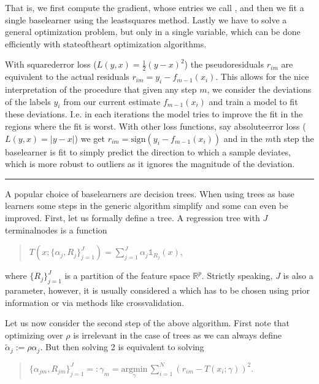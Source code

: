 \documentclass[letterpaper,10pt,english]{sphinxmanual}
\begin{document}
That is, we first compute the gradient, whose entries we call , and then we fit a single base\sphinxhyphen{}learner using the least\sphinxhyphen{}squares method. Lastly we have to solve a general optimization problem, but only in a single variable, which can be done efficiently with state\sphinxhyphen{}of\sphinxhyphen{}the\sphinxhyphen{}art optimization algorithms.

With squared\sphinxhyphen{}error loss (\(L(y, x) = \frac{1}{2}(y - x)^2\)) the pseudo\sphinxhyphen{}residuals \(r_{im}\) are equivalent to the actual residuals \(r_{im} = y_i - f_{m-1}(x_i)\). This allows for the nice interpretation of the procedure that given any step \(m\), we consider the deviations of the labels \(y_i\) from our current estimate \(f_{m-1}(x_i)\) and train a model to fit these deviations. I.e. in each iterations the model tries to improve the fit in the regions where the fit is worst. With other loss functions, say absolute\sphinxhyphen{}error loss (\(L(y, x) = |y - x|\)) we get \(r_{im} = \text{sign}(y_i - f_{m-1}(x_i))\) and in the \(m\)\sphinxhyphen{}th step the base\sphinxhyphen{}learner is fit to simply predict the direction to which a sample deviates, which is more robust to outliers as it ignores the magnitude of the deviation.


\bigskip\hrule\bigskip



A popular choice of base\sphinxhyphen{}learners are decision trees. When using trees as base learners some steps in the generic algorithm simplify and some can even be improved. First, let us formally define a tree. A regression tree with \(J\) terminal\sphinxhyphen{}nodes is a function
\begin{quote}

\(T\left(x; \{\alpha_j, R_j\}_{j=1}^J \right) = \sum_{j=1}^J \alpha_j \mathbb{1}_{R_{j}}(x)\),
\end{quote}

where \(\{R_j\}_{j=1}^J\) is a partition of the feature space \(\mathbb{R}^p\). Strictly speaking, \(J\) is also a parameter, however, it is usually considered a  which has to be chosen using prior information or via methods like cross\sphinxhyphen{}validation.

Let us now consider the second step of the above algorithm. First note that optimizing over \(\rho\) is irrelevant in the case of trees as we can always define \(\tilde{\alpha}_j := \rho \alpha_j\). But then solving 2 is equivalent to solving
\begin{quote}

\(\{\alpha_{jm}, R_{jm}\}_{j=1}^J =: \gamma_m = \underset{\gamma}{\text{argmin}} \, \sum_{i=1}^N \left(r_{im} - T(x_i; \gamma) \right)^2\).
\end{quote}
\end{document}
